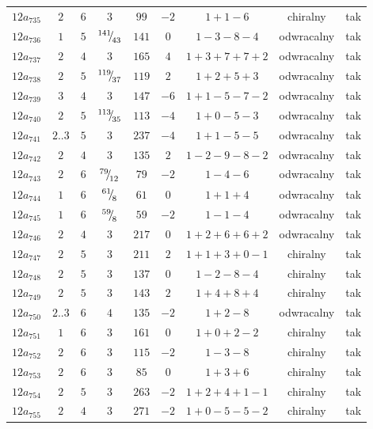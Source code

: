 \begin{longtable}{ccccccccc}
$12a_{735}$ & $2$ & $6$ & $3$ & $99$ & $-2$ & $1+1-6$ & chiralny & tak \\
$12a_{736}$ & $1$ & $5$ & ${}^{141}{\mskip -5mu/\mskip -3mu}_{43}$ & $141$ & $0$ & $1-3-8-4$ & odwracalny & tak \\
$12a_{737}$ & $2$ & $4$ & $3$ & $165$ & $4$ & $1+3+7+7+2$ & odwracalny & tak \\
$12a_{738}$ & $2$ & $5$ & ${}^{119}{\mskip -5mu/\mskip -3mu}_{37}$ & $119$ & $2$ & $1+2+5+3$ & odwracalny & tak \\
$12a_{739}$ & $3$ & $4$ & $3$ & $147$ & $-6$ & $1+1-5-7-2$ & odwracalny & tak \\
$12a_{740}$ & $2$ & $5$ & ${}^{113}{\mskip -5mu/\mskip -3mu}_{35}$ & $113$ & $-4$ & $1+0-5-3$ & odwracalny & tak \\
$12a_{741}$ & $2..3$ & $5$ & $3$ & $237$ & $-4$ & $1+1-5-5$ & odwracalny & tak \\
$12a_{742}$ & $2$ & $4$ & $3$ & $135$ & $2$ & $1-2-9-8-2$ & odwracalny & tak \\
$12a_{743}$ & $2$ & $6$ & ${}^{79}{\mskip -5mu/\mskip -3mu}_{12}$ & $79$ & $-2$ & $1-4-6$ & odwracalny & tak \\
$12a_{744}$ & $1$ & $6$ & ${}^{61}{\mskip -5mu/\mskip -3mu}_{8}$ & $61$ & $0$ & $1+1+4$ & odwracalny & tak \\
$12a_{745}$ & $1$ & $6$ & ${}^{59}{\mskip -5mu/\mskip -3mu}_{8}$ & $59$ & $-2$ & $1-1-4$ & odwracalny & tak \\
$12a_{746}$ & $2$ & $4$ & $3$ & $217$ & $0$ & $1+2+6+6+2$ & odwracalny & tak \\
$12a_{747}$ & $2$ & $5$ & $3$ & $211$ & $2$ & $1+1+3+0-1$ & chiralny & tak \\
$12a_{748}$ & $2$ & $5$ & $3$ & $137$ & $0$ & $1-2-8-4$ & chiralny & tak \\
$12a_{749}$ & $2$ & $5$ & $3$ & $143$ & $2$ & $1+4+8+4$ & chiralny & tak \\
$12a_{750}$ & $2..3$ & $6$ & $4$ & $135$ & $-2$ & $1+2-8$ & odwracalny & tak \\
$12a_{751}$ & $1$ & $6$ & $3$ & $161$ & $0$ & $1+0+2-2$ & chiralny & tak \\
$12a_{752}$ & $2$ & $6$ & $3$ & $115$ & $-2$ & $1-3-8$ & chiralny & tak \\
$12a_{753}$ & $2$ & $6$ & $3$ & $85$ & $0$ & $1+3+6$ & chiralny & tak \\
$12a_{754}$ & $2$ & $5$ & $3$ & $263$ & $-2$ & $1+2+4+1-1$ & chiralny & tak \\
$12a_{755}$ & $2$ & $4$ & $3$ & $271$ & $-2$ & $1+0-5-5-2$ & chiralny & tak \\

\end{longtable}
